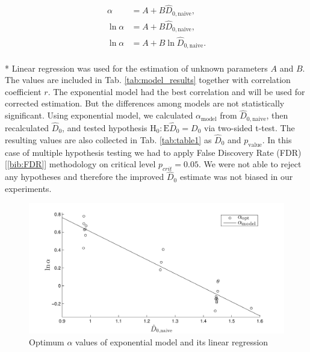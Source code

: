 \begin{equation}
\label{eq:models}
\begin{split}
 \alpha &= A + B \hat{D}_{0,\mathrm{naive}}, \\
 \ln \alpha &= A + B \hat{D}_{0,\mathrm{naive}}, \\
 \ln \alpha &= A + B \ln \hat{D}_{0,\mathrm{naive}}.
\end{split}
\end{equation}
\\*
Linear regression was used for the estimation of unknown parameters $A$ and $B$. The values are included in Tab. \ref{tab:model_results} together with correlation coefficient $r$. The exponential model had the best correlation and will be used for corrected estimation. But the differences among models are not statistically significant. Using exponential model, we calculated $\alpha_{\mathrm{model}}$ from $\hat{D}_{0,\mathrm{naive}}$, then recalculated $\hat{D}_0$, and tested hypothesis $\mathrm{H}_0:\text{E}\hat{D}_{0} = D_{0}$ via two-sided t-test. The resulting values are also collected in Tab. \ref{tab:table1} as $\hat{D}_{0}$ and $p_{\mathrm{value}}$. In this case of multiple hypothesis testing we had to apply False Discovery Rate (FDR) [\ref{bib:FDR}] methodology on critical level $p_{crit} = 0.05$. We were not able to reject any hypotheses and therefore the improved $\hat{D}_{0}$ estimate was not biased in our experiments.



\begin{figure}[tbp]
\centering
\includegraphics[scale=0.6]{images/graph_alpha_model} 
\caption{Optimum $\alpha$ values of exponential model and its linear regression}
\label{fig:graphAlphaModel}
\end{figure}

